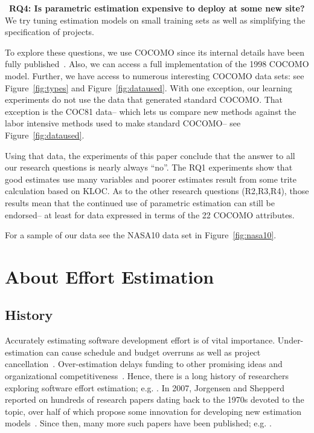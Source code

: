 \documentclass[smallcondesed]{svjour3}
\newcommand{\fig}[1]{Figure~\ref{fig:#1}}
\begin{document}
~{\bf RQ4: Is parametric estimation expensive to deploy  at some new site?}
We try   tuning estimation models on  small training sets 
as well as simplifying the specification of  projects.

 
 
To explore these questions, we use  COCOMO since its
internal details have been fully
published~\cite{boehm00b}. Also, we can access a full implementation of the  1998
COCOMO model.
Further, we have access to numerous interesting  COCOMO data
sets: see \fig{types} and \fig{dataused}.
With one exception, our learning experiments do not use the data
that generated   standard COCOMO.
That exception is the  COC81 data-- which  lets us  compare new methods
against the  labor intensive methods used to make standard COCOMO-- see 
\fig{dataused}.
 
 
Using that data,  the experiments of this paper conclude that
the answer to all  our  research questions is nearly always
``no''.  
The RQ1 experiments show that good estimates use many variables
and  poorer estimates result from   some trite calculation based on KLOC.   
%
As to the other research questions (R2,R3,R4), those results mean that 
the continued
use of parametric estimation can still be endorsed-- at least for data expressed
in terms of the 22 COCOMO attributes. 

For a sample of our data  see the NASA10 data set in \fig{nasa10}.

 \section{About Effort Estimation}
 \subsection{History}

Accurately estimating software development
effort  is of vital
importance. 
Under-estimation can cause schedule and budget
overruns as well as project
cancellation~\cite{CLCS03}.  Over-estimation delays
funding to other promising ideas and
organizational competitiveness~\cite{koc11a}.
Hence, there is a long history
of researchers exploring software effort estimation; e.g. \cite{wol74,frei79,putnam76,black77,herd77,watson77,jensen83,park88,boehm81,Walkerden1999,shepperd97,jorgensen05,me06d,burgess01}.
In 2007, Jorgensen and Shepperd
reported on hundreds of research papers dating back to the 1970s devoted to
the topic, over half of which propose some innovation
for developing new estimation
models~\cite{jorgensen05}. Since then,
many more such papers have been published;
e.g. \cite{lokan06,cora10,minku14,Li2007,Li2009a,keung2008a,keung2008b,keung2008c,koc11b,me12a,me13a,kocaguneli2014transfer}.
\end{document}
